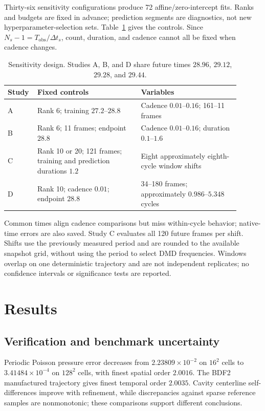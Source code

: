 \documentclass[11pt,a4paper]{article}
\begin{document}
Thirty-six sensitivity configurations produce 72 affine/zero-intercept fits. Ranks and budgets are fixed in advance; prediction segments are diagnostics, not new hyperparameter-selection sets. Table~\ref{tab:design} gives the controls. Since $N_s-1=T_{\mathrm{obs}}/\Delta t_s$, count, duration, and cadence cannot all be fixed when cadence changes.
\begin{table}[htbp]
\centering\small
\caption{Sensitivity design. Studies A, B, and D share future times $28.96$, $29.12$, $29.28$, and $29.44$.}\label{tab:design}
\begin{tabular}{p{0.08\linewidth}p{0.42\linewidth}p{0.40\linewidth}}\toprule
Study & Fixed controls & Variables\\\midrule
A & Rank 6; training $27.2$--$28.8$ & Cadence $0.01$--$0.16$; 161--11 frames\\
B & Rank 6; 11 frames; endpoint $28.8$ & Cadence $0.01$--$0.16$; duration $0.1$--$1.6$\\
C & Rank 10 or 20; 121 frames; training and prediction durations $1.2$ & Eight approximately eighth-cycle window shifts\\
D & Rank 10; cadence $0.01$; endpoint $28.8$ & 34--180 frames; approximately $0.986$--$5.348$ cycles\\\bottomrule
\end{tabular}
\end{table}
Common times align cadence comparisons but miss within-cycle behavior; native-time errors are also saved. Study C evaluates all 120 future frames per shift. Shifts use the previously measured period and are rounded to the available snapshot grid, without using the period to select DMD frequencies. Windows overlap on one deterministic trajectory and are not independent replicates; no confidence intervals or significance tests are reported.

\section{Results}
\subsection{Verification and benchmark uncertainty}
Periodic Poisson pressure error decreases from $2.23809\times10^{-2}$ on $16^2$ cells to $3.41484\times10^{-4}$ on $128^2$ cells, with finest spatial order $2.0016$. The BDF2 manufactured trajectory gives finest temporal order $2.0035$. Cavity centerline self-differences improve with refinement, while discrepancies against sparse reference samples are nonmonotonic; these comparisons support different conclusions.
\end{document}
